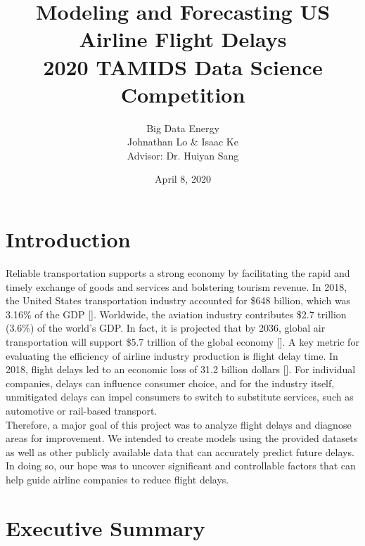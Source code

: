 \documentclass[12pt, a4paper, openany]{book}
\title{Modeling and Forecasting US Airline Flight Delays\\2020 TAMIDS Data Science Competition}
\author{Big Data Energy\\Johnathan Lo \& Isaac Ke\\Advisor: Dr. Huiyan Sang}
\date{April 8, 2020}
\newcommand\tab[1][1cm]{\hspace*{#1}}
\begin{document}
\pagestyle{empty}
\maketitle
  \tableofcontents \thispagestyle{empty}
\pagestyle{empty}
\chapter{Introduction}
\setcounter{page}{1}
\tab Reliable transportation supports a strong economy by facilitating the rapid and timely exchange of goods and services and bolstering tourism revenue. In 2018, the United States transportation industry accounted for \$648 billion, which was 3.16\% of the GDP [\cite{1}]. Worldwide, the aviation industry contributes \$2.7 trillion (3.6\%) of the world's GDP. In fact, it is projected that by 2036, global air transportation will support \$5.7 trillion of the global economy [\cite{2}]. A key metric for evaluating the efficiency of airline industry production is flight delay time. In 2018, flight delays led to an economic loss of 31.2 billion dollars [\cite{3}]. For individual companies, delays can influence consumer choice, and for the industry itself, unmitigated delays can impel consumers to switch to substitute services, such as automotive or rail-based transport. \\
\tab Therefore, a major goal of this project was to analyze flight delays and diagnose areas for improvement. We intended to create models using the provided datasets as well as other publicly available data that can accurately predict future delays. In doing so, our hope was to uncover significant and controllable factors that can help guide airline companies to reduce flight delays. 
\chapter{Executive Summary}
\end{document}
